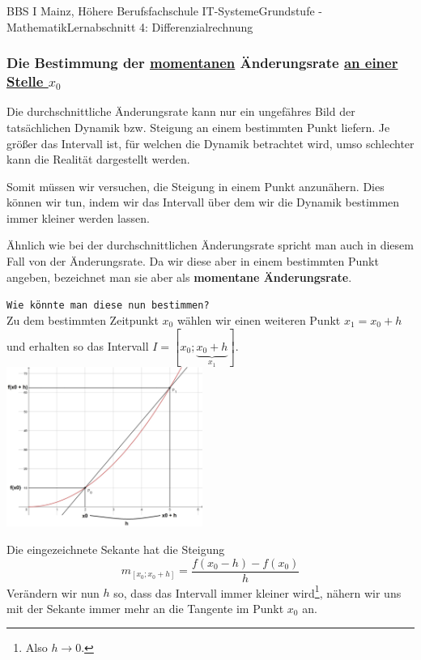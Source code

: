 \documentclass[11pt,twocolumn,oneside,openany,headings=optiontotoc,11pt,numbers=noenddot,final]{article}
\begin{document}
\begin{worksheet}{BBS I Mainz, Höhere Berufsfachschule IT-Systeme}{Grundstufe - Mathematik}{Lernabschnitt 4: Differenzialrechnung}
		\subsubsection*{Die Bestimmung der \underline{momentanen} Änderungsrate \underline{an einer Stelle \(x_0\)}}
		Die durchschnittliche Änderungsrate kann nur ein ungefähres Bild der tatsächlichen Dynamik bzw. Steigung an einem bestimmten Punkt liefern. Je größer das Intervall ist, für welchen die Dynamik betrachtet wird, umso schlechter kann die Realität dargestellt werden.\\
		\par\noindent
		Somit müssen wir versuchen, die Steigung in einem Punkt anzunähern. Dies können wir tun, indem wir das Intervall über dem wir die Dynamik bestimmen immer kleiner werden lassen.\\
		\par\noindent
		Ähnlich wie bei der durchschnittlichen Änderungsrate spricht man auch in diesem Fall von der Änderungsrate. Da wir diese aber in einem bestimmten Punkt angeben, bezeichnet man sie aber als \textbf{momentane Änderungsrate}.\\
		\par\noindent
		\texttt{Wie könnte man diese nun bestimmen?}\\
		Zu dem bestimmten Zeitpunkt \(x_0\) wählen wir einen weiteren Punkt \(x_1 = x_0 + h\) und erhalten so das Intervall \(I = [x_0; \underbrace{x_0 + h}_{x_1}]\).\\
		\includegraphics[width=0.48\textwidth]{../99_Bilder/04_Skr_DiffQuo.jpg}\\
		\par\noindent
		Die eingezeichnete Sekante hat die Steigung
		\[m_{[x_0;x_0+h]} = \frac{f(x_0-h) - f(x_0)}{h}\]
		Verändern wir nun \(h\) so, dass das Intervall immer kleiner wird\footnote{Also \(h\rightarrow{}0\).}, nähern wir uns mit der Sekante immer mehr an die Tangente im Punkt \(x_0\) an.
	\end{worksheet}
\end{document}
